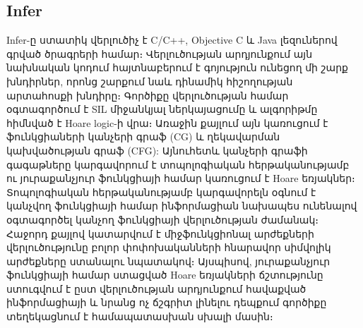 \subsection{Infer}
Infer\cite{Infer}-ը ստատիկ վերլուծիչ է C/C++, Objective C և Java լեզուներով գրված ծրագրերի համար։ Վերլուծության
արդյունքում այն նախնական կոդում հայտնաբերում է գոյություն ունեցող մի շարք խնդիրներ, որոնց շարքում նաև դինամիկ հիշողության
արտահոսքի խնդիրը։ Գործիքը վերլուծության համար օգտագործում է SIL\cite{SIL} միջանկյալ ներկայացումը և ալգորիթմը հիմնված է
Hoare logic\cite{Hoare1969}-ի վրա։ Առաջին քայլում այն կառուցում է ֆունկցիաների կանչերի գրաֆ (CG) և ղեկավարման
կախվածության գրաֆ (CFG): Այնուհետև կանչերի գրաֆի գագաթները կարգավորում է տոպոլոգիական հերթականությամբ ու յուրաքանչյուր
ֆունկցիայի համար կառուցում է Hoare եռյակներ։ Տոպոլոգիական հերթականությամբ կարգավորելն օգնում է կանչվող ֆունկցիայի
համար ինֆորմացիան նախապես ունենալով օգտագործել կանչող ֆունկցիայի վերլուծության ժամանակ։ Հաջորդ քայլով կատարվում է
միջֆունկցիոնալ արժեքների վերլուծությունը\cite{Reps1995} բոլոր փոփոխականների հնարավոր սիմվոլիկ արժեքները ստանալու նպատակով։
Այսպիսով, յուրաքանչյուր ֆունկցիայի համար ստացված Hoare եռյակների ճշտությունը ստուգվում է ըստ վերլուծության արդյունքում
հավաքված ինֆորմացիայի և նրանց ոչ ճշգրիտ լինելու դեպքում գործիքը տեղեկացնում է համապատասխան սխալի մասին։